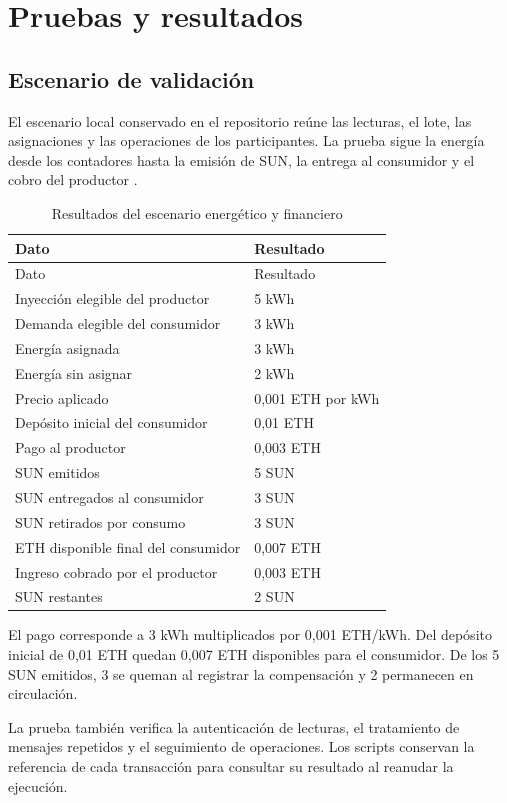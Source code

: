 \section{Pruebas y resultados}
\subsection{Escenario de validación}
El escenario local conservado en el repositorio reúne las lecturas, el lote, las asignaciones y las operaciones de los participantes. La prueba sigue la energía desde los contadores hasta la emisión de SUN, la entrega al consumidor y el cobro del productor \citep{scenario,verification}.

\begin{longtable}{L{.53\linewidth}L{.37\linewidth}}
\caption{Resultados del escenario energético y financiero}\label{tab:escenario}\\
\toprule Dato & Resultado \\ \midrule\endfirsthead
\toprule Dato & Resultado \\ \midrule\endhead
Inyección elegible del productor & 5 kWh\\
Demanda elegible del consumidor & 3 kWh\\
Energía asignada & 3 kWh\\
Energía sin asignar & 2 kWh\\
Precio aplicado & 0,001 ETH por kWh\\
Depósito inicial del consumidor & 0,01 ETH\\
Pago al productor & 0,003 ETH\\
SUN emitidos & 5 SUN\\
SUN entregados al consumidor & 3 SUN\\
SUN retirados por consumo & 3 SUN\\
ETH disponible final del consumidor & 0,007 ETH\\
Ingreso cobrado por el productor & 0,003 ETH\\
SUN restantes & 2 SUN\\
\bottomrule
\end{longtable}
El pago corresponde a 3 kWh multiplicados por 0,001 ETH/kWh. Del depósito inicial de 0,01 ETH quedan 0,007 ETH disponibles para el consumidor. De los 5 SUN emitidos, 3 se queman al registrar la compensación y 2 permanecen en circulación.

La prueba también verifica la autenticación de lecturas, el tratamiento de mensajes repetidos y el seguimiento de operaciones. Los scripts conservan la referencia de cada transacción para consultar su resultado al reanudar la ejecución.

